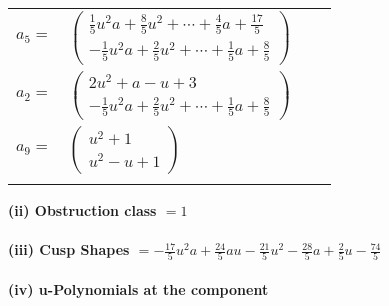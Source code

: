 \documentclass[1p]{elsarticle_modified}
\theoremstyle{definition}
\begin{document}
\begin{tabular}{m{7pt} m{180pt} m{7pt} m{180pt} }
\flushright $a_{5}=$&$\begin{pmatrix}\frac{1}{5} u^2 a+\frac{8}{5} u^2+\cdots+\frac{4}{5} a+\frac{17}{5}\\-\frac{1}{5} u^2 a+\frac{2}{5} u^2+\cdots+\frac{1}{5} a+\frac{8}{5}\end{pmatrix}$ \\
\flushright $a_{2}=$&$\begin{pmatrix}2 u^2+a- u+3\\-\frac{1}{5} u^2 a+\frac{2}{5} u^2+\cdots+\frac{1}{5} a+\frac{8}{5}\end{pmatrix}$ \\
\flushright $a_{9}=$&$\begin{pmatrix}u^2+1\\u^2- u+1\end{pmatrix}$\\&\end{tabular}
\flushleft \textbf{(ii) Obstruction class $= 1$}\\~\\
\flushleft \textbf{(iii) Cusp Shapes $= -\frac{17}{5} u^2 a+\frac{24}{5} a u-\frac{21}{5} u^2-\frac{28}{5} a+\frac{2}{5} u-\frac{74}{5}$}\\~\\
\newpage\renewcommand{\arraystretch}{1}
\flushleft \textbf{(iv) u-Polynomials at the component}\newline \\
\end{document}
